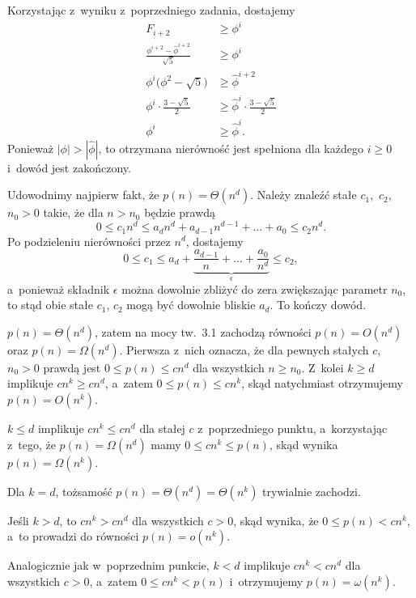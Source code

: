 \exercise %
Korzystając z~wyniku z~poprzedniego zadania, dostajemy
\begin{align*}
	F_{i+2} &\ge \phi^i \\
	\frac{\phi^{i+2}-\widehat\phi^{i+2}}{\sqrt{5}} &\ge \phi^i \\
	\phi^i\bigl(\phi^2-\sqrt{5}\bigr) &\ge \widehat\phi^{i+2} \\
	\phi^i\cdot\frac{3-\sqrt{5}}{2} &\ge \widehat\phi^i\cdot\frac{3-\sqrt{5}}{2} \\
	\phi^i &\ge \widehat\phi^i.
\end{align*}
Ponieważ $|\phi|>|\widehat\phi|$, to otrzymana nierówność jest spełniona dla każdego $i\ge0$ i~dowód jest zakończony.

\problems

Udowodnimy najpierw fakt, że $p(n)=\Theta(n^d)$. Należy znaleźć stałe $c_1$,~$c_2$,~$n_0>0$ takie, że dla $n>n_0$ będzie prawdą
\[
	0 \le c_1n^d \le a_dn^d+a_{d-1}n^{d-1}+\dots+a_0 \le c_2n^d.
\]
Po podzieleniu nierówności przez $n^d$, dostajemy
\[
	0 \le c_1 \le a_d+\underbrace{\frac{a_{d-1}}{n}+\dots+\frac{a_0}{n^d}}_\epsilon \le c_2,
\]
a~ponieważ składnik $\epsilon$ można dowolnie zbliżyć do zera zwiększając parametr $n_0$, to stąd obie stałe $c_1$, $c_2$ mogą być dowolnie bliskie $a_d$. To kończy dowód.

\subproblem %
$p(n)=\Theta(n^d)$, zatem na mocy tw.~3.1 zachodzą równości $p(n)=O(n^d)$ oraz $p(n)=\Omega(n^d)$. Pierwsza z~nich oznacza, że dla pewnych stałych $c$,~$n_0>0$ prawdą jest $0\le p(n)\le cn^d$ dla wszystkich $n\ge n_0$. Z~kolei $k\ge d$ implikuje $cn^k\ge cn^d$, a~zatem $0\le p(n)\le cn^k$, skąd natychmiast otrzymujemy $p(n)=O(n^k)$.

\subproblem %
$k\le d$ implikuje $cn^k\le cn^d$ dla stałej $c$ z~poprzedniego punktu, a~korzystając z~tego, że $p(n)=\Omega(n^d)$ mamy $0\le cn^k\le p(n)$, skąd wynika $p(n)=\Omega(n^k)$.

\subproblem %
Dla $k=d$, tożsamość $p(n)=\Theta(n^d)=\Theta(n^k)$ trywialnie zachodzi.

\subproblem %
Jeśli $k>d$, to $cn^k>cn^d$ dla wszystkich $c>0$, skąd wynika, że $0\le p(n)<cn^k$, a~to prowadzi do równości $p(n)=o(n^k)$.

\subproblem %
Analogicznie jak w~poprzednim punkcie, $k<d$ implikuje $cn^k<cn^d$ dla wszystkich $c>0$, a~zatem $0\le cn^k<p(n)$ i~otrzymujemy $p(n)=\omega(n^k)$.



